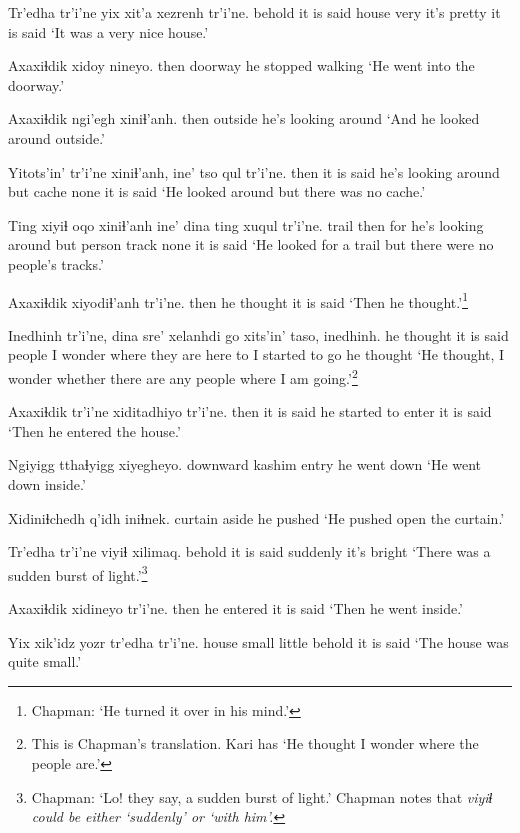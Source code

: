 \documentclass[12pt]{article}
\begin{document}
\gll Tr'edha tr'i'ne yix xit'a xezrenh tr'i'ne.
behold  {it is said} house very {it's pretty} {it is said}
\glt `It was a very nice house.'
\glend

\gll Axaxiɬdik xidoy nineyo.
then  doorway {he stopped walking}
\glt `He went into the doorway.'
\glend

\gll Axaxiɬdik ngi'egh xiniɬ'anh.
then  outside  {he's looking around}
\glt `And he looked around outside.'
\glend

\gll Yitots'in' tr'i'ne xiniɬ'anh, ine' tso qul tr'i'ne.
then  {it is said} {he's looking around} but cache none {it is said}
\glt `He looked around but there was no cache.'
\glend

\gll Ting xiyiɬ oqo xiniɬ'anh ine' dina  ting xuqul  tr'i'ne.
trail then for {he's looking around} but person  track none {it is said}
\glt `He looked for a trail but there were no people's tracks.'
\glend

\gll Axaxiɬdik xiyodiɬ'anh tr'i'ne.
then  {he thought} {it is said}
\glt `Then he thought.'\footnote{Chapman: `He turned it over in his mind.'}
\glend

\gll Inedhinh tr'i'ne, dina  sre'  xelanhdi go xits'in' taso,  inedhinh.
{he thought} {it is said} people {I wonder} {where they are} here to {I started to go} {he thought}
\glt `He thought, I wonder whether there are any people where I am going.'\footnote{This is Chapman's translation. Kari has `He thought I wonder where the people are.'}
\glend

\gll Axaxiɬdik tr'i'ne xiditadhiyo  tr'i'ne.
then  {it is said} {he started to enter} {it is said}
\glt `Then he entered the house.'
\glend

\gll Ngiyigg tthaɬyigg xiyegheyo. 
 downward {kashim entry} {he went down} 
\glt `He went down inside.'
\glend

\gll Xidiniɬchedh q'idh iniɬnek.
curtain   aside {he pushed}
\glt `He pushed open the curtain.'
\glend

\gll Tr'edha tr'i'ne viyiɬ  xilimaq.
behold  {it is said} suddenly {it's bright}
\glt `There was a sudden burst of light.'\footnote{Chapman:  `Lo! they say, a sudden burst of light.' Chapman notes that \em viyiɬ \em could be either `suddenly' or `with him'.}
\glend

\gll Axaxiɬdik xidineyo tr'i'ne.
then  {he entered} {it is said}
\glt `Then he went inside.'
\glend

\gll Yix xik'idz yozr tr'edha tr'i'ne.
house small little behold {it is said}
\glt `The house was quite small.'
\glend
\end{document}
